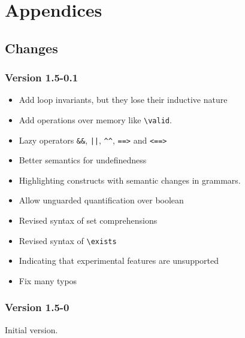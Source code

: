 \documentclass[a4paper,web]{frama-c-book}
\begin{document}








\appendix

\chapter{Appendices}
\label{chap:appendix}


%

%

%

\section{Changes}

\subsection{Version 1.5-0.1}

\begin{itemize}
\item Add loop invariants, but they lose their inductive \acsl nature
\item Add operations over memory like \lstinline|\valid|.
\item Lazy operators \lstinline|&&|, \lstinline+||+, \lstinline|^^|,
  \lstinline|==>| and \lstinline|<==>|
\item Better semantics for undefinedness
\item Highlighting constructs with semantic changes in grammars.
\item Allow unguarded quantification over boolean
\item Revised syntax of set comprehensions
\item Revised syntax of \lstinline|\exists|
\item Indicating that experimental \acsl features are unsupported
\item Fix many typos
\end{itemize}

\subsection{Version 1.5-0}

Initial version.

\cleardoublepage
{}



\cleardoublepage
{}
\listoffigures

\cleardoublepage
{}
\printindex
\end{document}
